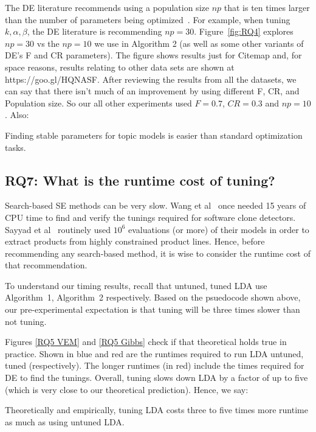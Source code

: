 \documentclass[twocolumn,5p,sort&compress]{elsarticle}
\theoremstyle{break}
\begin{document}
The DE literature
recommends using a population size $np$ that is ten times larger than the number of parameters being
optimized~\cite{storn1997differential}.  For example, when tuning $k,\alpha,\beta$,
the DE literature is recommending $np=30$.
Figure~\ref{fig:RQ4} explores $np=30$ vs the $np=10$ we use in Algorithm 2
(as well as some other variants of DE's F and CR parameters).
The figure shows results just for Citemap and, for space reasons, results
relating to other data sets are shown at https://goo.gl/HQNASF.
After reviewing the results from all the datasets, we can say that there isn't much of an improvement by using different F, CR, and Population size. So our all other experiments used $F=0.7$, $CR=0.3$ and $np = 10$.
Also:

\begin{lesson}
  Finding stable parameters for
  topic models is easier than standard optimization tasks.
\end{lesson}

\subsection{\textbf{RQ7: What is the runtime cost of tuning?}}

Search-based SE methods can be very slow. Wang et al~\cite{wang2013searching} once needed 15
years of CPU time to find and verify the tunings required for software
clone detectors. Sayyad et al~\cite{sayyad2013scalable} routinely used
$10^6$ evaluations (or more) of their models in order to extract
products from highly constrained product
lines. Hence, before recommending any
search-based method, it is wise to consider the runtime cost of that
recommendation.

To understand our timing results, recall that untuned, tuned LDA use
Algorithm~1, Algorithm~2 respectively. Based on the psuedocode
shown above, our pre-experimental expectation is that
tuning will be three times slower than not tuning.
 
Figures \ref{RQ5 VEM} and \ref{RQ5 Gibbs} check if that theoretical
holds true in practice. Shown in blue and red are the
  runtimes required to run LDA untuned, tuned (respectively).  The
  longer runtimes (in red) include the times required for DE to find
  the tunings. Overall, tuning slows down LDA by a factor of up to
  five (which is very close to our theoretical prediction).
  Hence, we say:

  
  \begin{lesson}
    Theoretically and empirically, tuning LDA costs three to five times more runtime
    as much as using untuned LDA.
  \end{lesson}
\end{document}
